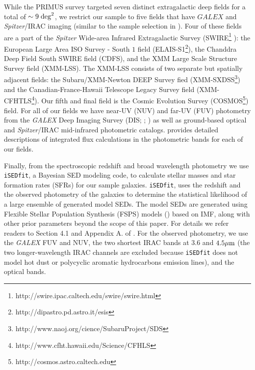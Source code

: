 \documentclass{emulateapj}
\begin{document}
While the PRIMUS survey targeted seven distinct extragalactic deep fields for a total of $\sim 9 \; \rm{deg}^2$, we restrict our sample to five fields that have $GALEX$ and {\em Spitzer}/IRAC imaging (similar to the sample selection in \cite{Moustakas:2013aa}). Four of these fields are a part of the {\em Spitzer} Wide-area Infrared Extragalactic Survey (SWIRE\footnote{http://swire.ipac.caltech.edu/swire/swire.html} ): the European Large Area ISO Survey - South $1$ field (ELAIS-S1\footnote{http://dipastro.pd.astro.it/esis}), the Chanddra Deep Field South SWIRE field (CDFS), and the XMM Large Scale Structure Survey field (XMM-LSS). The XMM-LSS consists of two separate but spatially adjacent fields: the Subaru/XMM-Newton DEEP Survey fied (XMM-SXDSS\footnote{http://www.naoj.org/cience/SubaruProject/SDS}) and the Canadian-France-Hawaii Telescope Legacy Survey field (XMM-CFHTLS\footnote{http://www.cfht.hawaii.edu/Science/CFHLS}). Our fifth and final field is the Cosmic Evolution Survey (COSMOS\footnote{http://cosmos.astro.caltech.edu}) field. For all of our fields we have near-UV (NUV) and far-UV (FUV) photometry from the {\em GALEX} Deep Imaging Survey (DIS; \cite{Martin:2005aa}; \cite{Morrissey:2005aa}) as well as ground-based optical and {\em Spitzer}/IRAC mid-infrared photometric catalogs. \cite{Moustakas:2013aa} provides detailed descriptions of integrated flux calculations in the photometric bands for each of our fields. 

Finally, from the spectroscopic redshift and broad wavelength photometry we use \texttt{iSEDfit}, a Bayesian SED modeling code, to calculate stellar masses and star formation rates (SFRs) for our sample galaxies. \texttt{iSEDfit}, uses the redshift and the observed photometry of the galaxies to determine the statistical likelihood of a large ensemble of generated model SEDs. The model SEDs are generated using Flexible Stellar Population Synthesis (FSPS) models (\cite{Conroy:2010aa}) based on \cite{Chabrier:2003aa} IMF, along with other prior parameters beyond the scope of this paper. For details we refer readers to Section 4.1 and Appendix A. of \cite{Moustakas:2013aa}. For the observed photometry, we use the {\em GALEX} FUV and NUV, the two shortest IRAC bands at $3.6$ and $4.5 \mu \rm{m}$ (the two longer-wavelength IRAC channels are excluded because \texttt{iSEDfit} does not model hot dust or polycyclic aromatic hydrocarbons emission lines), and the optical bands. 
\end{document}
